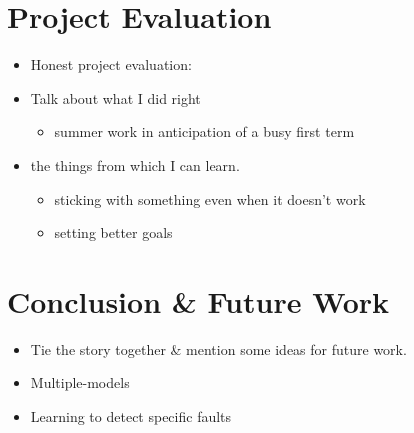 \documentclass[11pt, a4paper]{report}
\begin{document}
\chapter{Project Evaluation}
\label{cha:project-evaluation}

\begin{itemize}
\item Honest project evaluation:
\item Talk about what I did right
  \begin{itemize}
  \item summer work in anticipation of a busy first term
  \end{itemize}
\item the things from which I can learn.
  \begin{itemize}
  \item sticking with something even when it doesn't work
  \item setting better goals
  \end{itemize}
\end{itemize}

\chapter{Conclusion \& Future Work}
\label{cha:conclusion}

\begin{itemize}
\item Tie the story together \& mention some ideas for future
  work.
\item Multiple-models
\item Learning to detect specific faults
\end{itemize}


% 
% 
% 
% 
% 
% 
% 
% 


\end{document}
